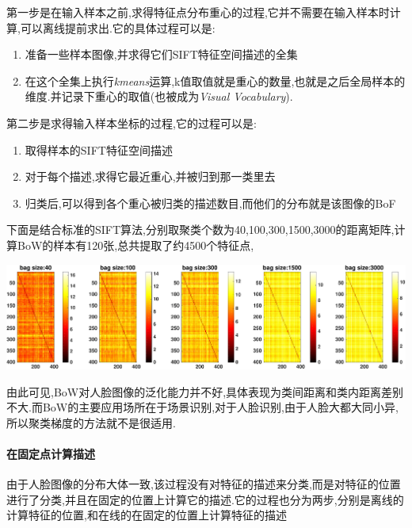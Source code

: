 	第一步是在输入样本之前,求得特征点分布重心的过程,它并不需要在输入样本时计算,可以离线提前求出.它的具体过程可以是:
	\begin{enumerate}
		\item 准备一些样本图像,并求得它们SIFT特征空间描述的全集
		\item 在这个全集上执行\textit{kmeans}运算,k值取值就是重心的数量,也就是之后全局样本的维度.并记录下重心的取值(也被成为\textit{Visual Vocabulary}).
	\end{enumerate}
	第二步是求得输入样本坐标的过程,它的过程可以是:
	\begin{enumerate}
		\item 取得样本的SIFT特征空间描述
		\item 对于每个描述,求得它最近重心,并被归到那一类里去
		\item 归类后,可以得到各个重心被归类的描述数目,而他们的分布就是该图像的BoF
	\end{enumerate}
	
	下面是结合标准的SIFT算法,分别取聚类个数为40,100,300,1500,3000的距离矩阵,计算BoW的样本有120张,总共提取了约4500个特征点,
	
		\begin{center}
		\begin{minipage}[t]{\linewidth}
		\center
		{
		\includegraphics[width=\textwidth]{Img/c3/sift_bow_iter} 
		}
		\end{minipage}
		\medskip
		\end{center}
		
		由此可见,BoW对人脸图像的泛化能力并不好,具体表现为类间距离和类内距离差别不大.而BoW的主要应用场所在于场景识别,对于人脸识别,由于人脸大都大同小异,所以聚类梯度的方法就不是很适用.
	\paragraph{在固定点计算描述}
	由于人脸图像的分布大体一致,该过程没有对特征的描述来分类,而是对特征的位置进行了分类,并且在固定的位置上计算它的描述.它的过程也分为两步,分别是离线的计算特征的位置,和在线的在固定的位置上计算特征的描述\newline
	
